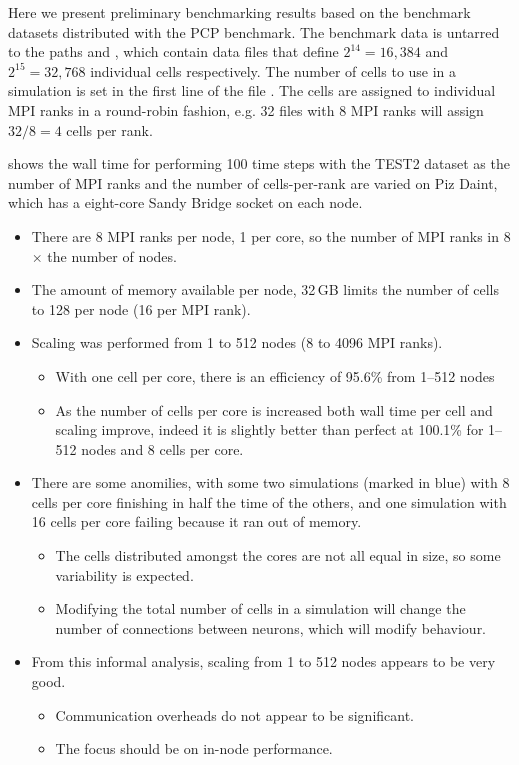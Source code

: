 Here we present preliminary benchmarking results based on the benchmark datasets distributed with the PCP benchmark. The benchmark data is untarred to the paths  and , which contain data files  that define $2^{14}=16,384$ and $2^{15}=32,768$ individual cells respectively. The number of cells to use in a simulation is set in the first line of the file . The cells are assigned to individual MPI ranks in a round-robin fashion, e.g. 32 files with 8 MPI ranks will assign $32/8=4$ cells per rank.

 shows the wall time for performing 100 time steps with the TEST2 dataset as the number of MPI ranks and the number of cells-per-rank are varied on Piz Daint, which has a eight-core Sandy Bridge socket on each node.
\begin{itemize}
\item
    There are 8 MPI ranks per node, 1 per core, so the number of MPI ranks in 8$\times$ the number of nodes.
\item
    The amount of memory available per node, 32\,GB limits the number of cells to 128 per node (16 per MPI rank).
\item
    Scaling was performed from 1 to 512 nodes (8 to 4096 MPI ranks).
    \begin{itemize}
    \item
        With one cell per core, there is an efficiency of 95.6\% from 1--512 nodes
    \item
        As the number of cells per core is increased both wall time per cell and scaling improve, indeed it is slightly better than perfect at 100.1\% for 1--512 nodes and 8 cells per core.
    \end{itemize}
\item
    There are some anomilies, with some two simulations (marked in blue) with 8 cells per core finishing in half the time of the others, and one simulation with 16 cells per core failing because it ran out of memory.
    \begin{itemize}
    \item
        The cells distributed amongst the cores are not all equal in size, so some variability is expected.
    \item
        Modifying the total number of cells in a simulation will change the number of connections between neurons, which will modify behaviour.
    \end{itemize}
\item
    From this informal analysis, scaling from 1 to 512 nodes appears to be very good.
    \begin{itemize}
    \item
        Communication overheads do not appear to be significant.
    \item
        The focus should be on in-node performance.
    \end{itemize}
\end{itemize}

